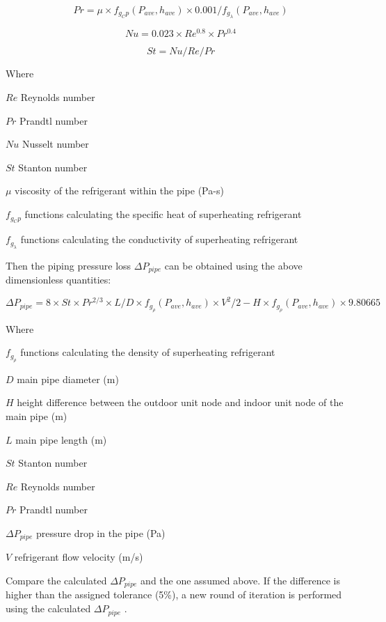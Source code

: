 \begin{equation}
Pr = \mu\times{f_{g_Cp}(P_{ave},h_{ave})}\times{0.001}/f_{g_\lambda}(P_{ave},h_{ave})
\end{equation}

\begin{equation}
Nu = 0.023\times{Re^{0.8}\times{Pr^{0.4}}}
\end{equation}

\begin{equation}
St = Nu/Re/Pr
\end{equation}

Where

\(Re\) Reynolds number

\(Pr\) Prandtl number

\(Nu\) Nusselt number

\(St\) Stanton number

\(\mu\) viscosity of the refrigerant within the pipe (Pa-s)

\(f_{g_Cp}\) functions calculating the specific heat of superheating refrigerant

\(f_{g_\lambda}\) functions calculating the conductivity of superheating refrigerant

Then the piping pressure loss \(\Delta{P_{pipe}}\) can be obtained using the above dimensionless quantities:

\begin{equation}
\Delta{P_{pipe}} = 8\times{St}\times{Pr^{2/3}}\times{L/D}\times{f_{g_\rho}(P_{ave},h_{ave})}\times{V^2}/2-H\times{f_{g_\rho}(P_{ave},h_{ave})}\times9.80665
\end{equation}

Where

\(f_{g_\rho}\) functions calculating the density of superheating refrigerant

\(D\) main pipe diameter (m)

\(H\) height difference between the outdoor unit node and indoor unit node of the main pipe (m)

\(L\) main pipe length (m)

\(St\) Stanton number

\(Re\) Reynolds number

\(Pr\) Prandtl number

\(\Delta{P_{pipe}}\) pressure drop in the pipe (Pa)

\(V\) refrigerant flow velocity (m/s)

Compare the calculated \(\Delta{P_{pipe}}\) and the one assumed above. If the difference is higher than the assigned tolerance (5\%), a new round of iteration is performed using the calculated \(\Delta{P_{pipe}}\) .

